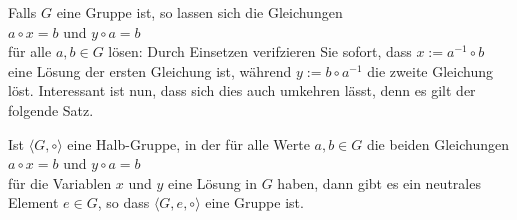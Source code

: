 \noindent
Falls $G$ eine Gruppe ist, so lassen sich die Gleichungen
\\[0.2cm]
\hspace*{1.3cm}
$a \circ x = b$ \quad und \quad $y \circ a = b$
\\[0.2cm]
für alle $a,b \in G$ lösen: Durch Einsetzen verifzieren Sie sofort, dass $x := a^{-1} \circ b$
eine Lösung der ersten Gleichung ist, während $y := b \circ a^{-1}$ die zweite Gleichung löst.
Interessant ist nun, dass sich dies auch umkehren lässt, denn es gilt der folgende Satz.

\begin{Satz} \label{satz:solvable}
Ist $\langle G, \circ \rangle$ eine Halb-Gruppe, in der für alle Werte $a,b \in G$ die beiden Gleichungen 
\\[0.2cm]
\hspace*{1.3cm}
$a \circ x = b$ \quad und \quad $y \circ a = b$
\\[0.2cm]  
für die Variablen $x$ und $y$ eine Lösung in $G$ haben, dann
gibt es ein neutrales Element $e \in G$, so 
dass $\langle G, e, \circ \rangle$  eine Gruppe ist.
\end{Satz}

